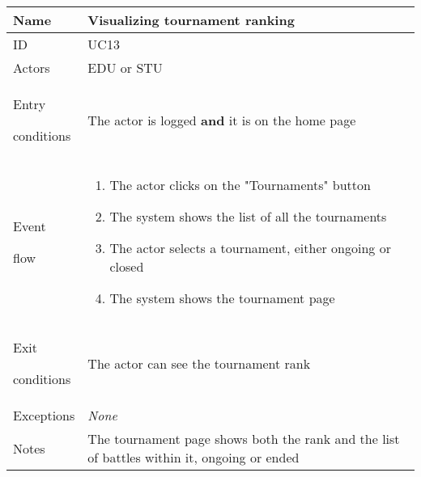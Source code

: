 \begin{center}
    \def\arraystretch{1.5}
    \begin{tabular}{| m{2cm} | m{10cm}|}
        \hline
        Name                  & Visualizing tournament ranking                                                              \\ \hline
        ID                    & UC13                                                                                        \\ \hline
        Actors                & EDU or STU                                                                                  \\ \hline
        Entry \par conditions & The actor is logged \textbf{and} it is on the home page                                     \\ \hline
        Event \par flow       & \begin{enumerate}
                                    \item The actor clicks on the "Tournaments" button
                                    \item The system shows the list of all the tournaments
                                    \item The actor selects a tournament, either ongoing or closed
                                    \item The system shows the tournament page
                                \end{enumerate}                               \\ \hline
        Exit \par conditions  & The actor can see the tournament rank                                                       \\ \hline
        Exceptions            & \textit{None}                                                                               \\ \hline
        Notes                 & The tournament page shows both the rank and the list of battles within it, ongoing or ended \\ \hline
    \end{tabular}
\end{center}

